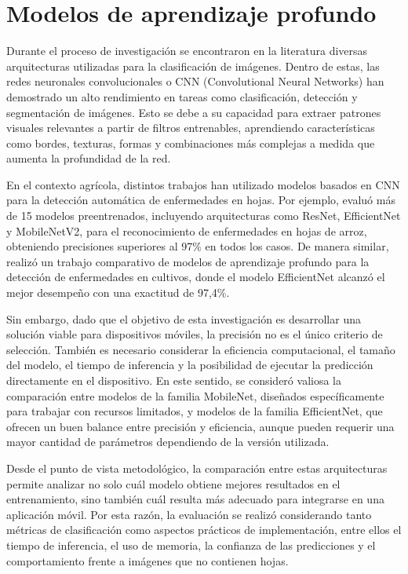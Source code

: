 \section{Modelos de aprendizaje profundo}
Durante el proceso de investigación se encontraron en la literatura diversas arquitecturas utilizadas para la clasificación
de imágenes. Dentro de estas, las redes neuronales convolucionales o CNN (Convolutional Neural Networks) han demostrado un alto
rendimiento en tareas como clasificación, detección y segmentación de imágenes. Esto se debe a su capacidad para extraer patrones
visuales relevantes a partir de filtros entrenables, aprendiendo características como bordes, texturas, formas y combinaciones más
complejas a medida que aumenta la profundidad de la red.

En el contexto agrícola, distintos trabajos han utilizado modelos basados en CNN para la detección automática de enfermedades en hojas.
Por ejemplo, \cite{agronomy13040961} evaluó más de 15 modelos preentrenados, incluyendo arquitecturas como ResNet, EfficientNet y
MobileNetV2, para el reconocimiento de enfermedades en hojas de arroz, obteniendo precisiones superiores al 97\% en todos los casos.
De manera similar, \cite{subramaniam2026comparative} realizó un trabajo comparativo de modelos de aprendizaje profundo para la
detección de enfermedades en cultivos, donde el modelo EfficientNet alcanzó el mejor desempeño con una exactitud de 97,4\%.

Sin embargo, dado que el objetivo de esta investigación es desarrollar una solución viable para dispositivos móviles, la precisión no
es el único criterio de selección. También es necesario considerar la eficiencia computacional, el tamaño del modelo, el tiempo de
inferencia y la posibilidad de ejecutar la predicción directamente en el dispositivo. En este sentido, se consideró valiosa la
comparación entre modelos de la familia MobileNet, diseñados específicamente para trabajar con recursos limitados, y modelos de la
familia EfficientNet, que ofrecen un buen balance entre precisión y eficiencia, aunque pueden requerir una mayor cantidad de parámetros
dependiendo de la versión utilizada.

Desde el punto de vista metodológico, la comparación entre estas arquitecturas permite analizar no solo cuál modelo obtiene mejores
resultados en el entrenamiento, sino también cuál resulta más adecuado para integrarse en una aplicación móvil. Por esta razón, la
evaluación se realizó considerando tanto métricas de clasificación como aspectos prácticos de implementación, entre ellos el tiempo de
inferencia, el uso de memoria, la confianza de las predicciones y el comportamiento frente a imágenes que no contienen hojas.

